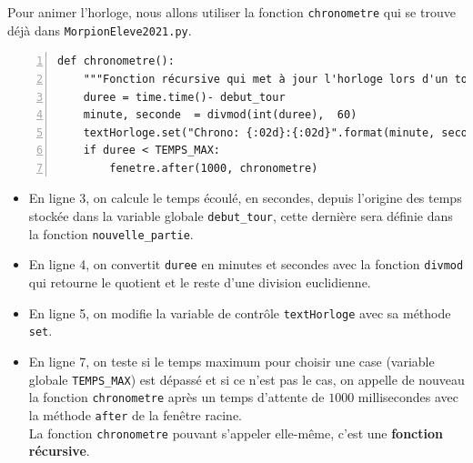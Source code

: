 \documentclass[a4paper, french, 12pt]{article}  %
\newcounter{def}
\begin{document}
Pour animer l'horloge, nous allons utiliser la fonction \lstinline+chronometre+ qui se trouve déjà dans \texttt{MorpionEleve2021.py}.





\begin{lstlisting}[numbers=left]
def chronometre():
    """Fonction récursive qui met à jour l'horloge lors d'un tour"""
    duree = time.time()- debut_tour
    minute, seconde  = divmod(int(duree),  60)
    textHorloge.set("Chrono: {:02d}:{:02d}".format(minute, seconde))
    if duree < TEMPS_MAX:
        fenetre.after(1000, chronometre)
\end{lstlisting}


\begin{itemize}[label=]
	\item En ligne 3, on calcule le temps écoulé, en secondes,  depuis l'origine des temps stockée dans la variable globale \lstinline+debut_tour+, cette dernière sera définie dans la fonction \lstinline+nouvelle_partie+.
	\item En ligne 4, on convertit \lstinline+duree+ en minutes et secondes avec la fonction \lstinline+divmod+ qui retourne le quotient et le reste d'une division euclidienne.
	\item En ligne 5, on modifie la variable de contrôle \lstinline+textHorloge+ avec sa méthode \lstinline+set+. 
	\item En ligne 7, on teste si le temps maximum pour choisir une case (variable  globale \lstinline+TEMPS_MAX+) est dépassé et si ce n'est pas le cas, on appelle de nouveau la fonction \lstinline+chronometre+ après un temps d'attente de $1000$ millisecondes avec la méthode \lstinline+after+ de la fenêtre racine.\\
	La fonction \lstinline+chronometre+  pouvant s'appeler elle-même, c'est une \textbf{fonction récursive}. 
	\end{itemize}
	
\newpage
\end{document}

